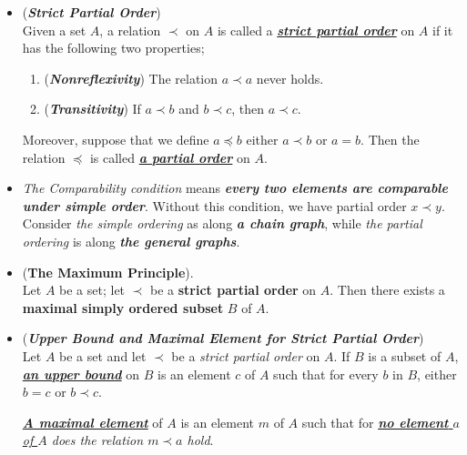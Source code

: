 \documentclass[11pt]{article}
\begin{document}
\begin{itemize}
\item \begin{definition} (\emph{\textbf{Strict Partial Order}})\\
Given a set $A$, a relation $\prec$ on $A$ is called a \underline{\emph{\textbf{strict partial order}}} on $A$ if it has the following two properties;
\begin{enumerate}
\item (\emph{\textbf{Nonreflexivity}}) The relation $a \prec a$ never holds.
\item (\emph{\textbf{Transitivity}}) If $a \prec b$ and $b \prec c$, then $a \prec c$.
\end{enumerate}
Moreover, suppose that we define $a \preceq b$ either $a \prec b$ or $a = b$. Then the relation $\preceq$ is called \underline{\emph{\textbf{a partial order}}} on $A$.
\end{definition}

\item \begin{remark}
\emph{The Comparability condition} means \emph{\textbf{every two elements are comparable under simple order}}. Without this condition, we have partial order $x \prec y$. Consider \emph{the simple ordering} as along \emph{\textbf{a chain graph}}, while \emph{the partial ordering} is along \emph{\textbf{the general graphs}}.
\end{remark}

\item \begin{theorem} (\textbf{The Maximum Principle}).\\
Let $A$ be a set; let $\prec$ be a \textbf{strict partial order} on $A$. Then there exists a \textbf{maximal simply ordered subset} $B$ of $A$.
\end{theorem}

\item \begin{definition} (\emph{\textbf{Upper Bound and Maximal Element for Strict Partial Order}})\\
Let $A$ be a set and let $\prec$ be a \emph{strict partial order} on $A$. If $B$ is a subset of $A$, \underline{\emph{\textbf{an upper bound}}} on $B$ is an element $c$ of $A$ such that for every $b$ in $B$, either $b = c$ or $b \prec c$. 

\underline{\emph{\textbf{A maximal element}}} of $A$ is an element $m$ of $A$ such that for \emph{\underline{\textbf{no element} $a$ of $A$} does the relation $m \prec a$ hold}.
\end{definition}


\end{itemize}
\end{document}
